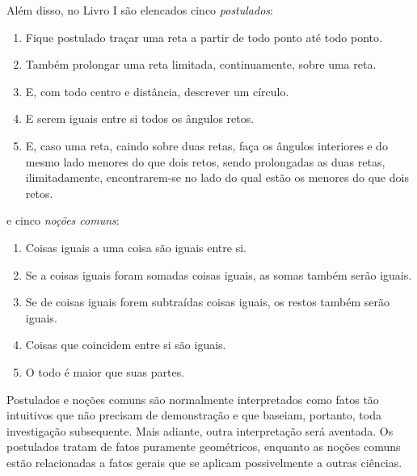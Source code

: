 \documentclass{hipatia}
\begin{document}
Além disso, no Livro I são elencados cinco \emph{postulados}:
\begin{enumerate}
\item    Fique postulado traçar uma reta a partir de todo ponto até todo ponto.
\item    Também prolongar uma reta limitada, continuamente, sobre uma reta.
\item    E, com todo centro e distância, descrever um círculo.
\item     E serem iguais entre si todos os ângulos retos.
\item    E, caso uma reta, caindo sobre duas retas, faça os ângulos interiores e do mesmo lado menores do que dois retos, sendo prolongadas as duas retas, ilimitadamente, encontrarem-se no lado do qual estão os menores do que dois retos.
\end{enumerate}
e cinco \emph{noções comuns}:
\begin{enumerate}
    \item 
  Coisas iguais a uma coisa são iguais entre si.
\item  Se a coisas iguais foram somadas coisas iguais, as somas também serão iguais.
\item  Se de coisas iguais forem subtraídas coisas iguais, os restos também serão iguais.
\item  Coisas que coincidem entre si são iguais. 
\item O todo é maior que suas partes.
\end{enumerate}

Postulados e noções comuns são normalmente
interpretados como fatos tão intuitivos 
que não precisam de demonstração e que 
baseiam, portanto, toda investigação subsequente. 
Mais adiante, outra interpretação será 
aventada. Os postulados tratam de fatos 
puramente geométricos, enquanto as noções
comuns estão relacionadas a fatos gerais 
que se aplicam possivelmente a outras ciências. 
\end{document}
